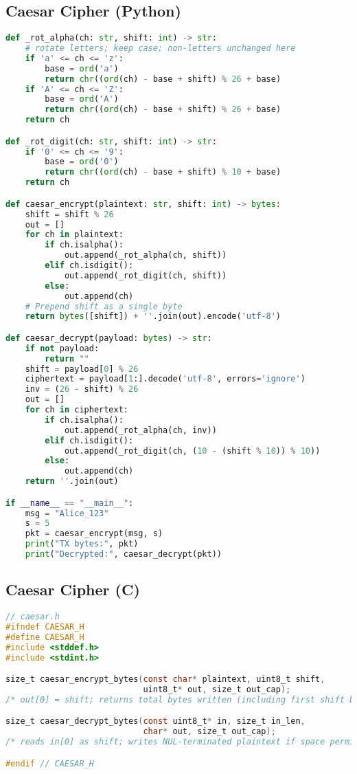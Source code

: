 \documentclass[11pt]{article}
\begin{document}
\subsection*{Caesar Cipher (Python)}
\begin{lstlisting}[language=Python, caption={caesar.py (Python sketch)}]
def _rot_alpha(ch: str, shift: int) -> str:
    # rotate letters; keep case; non-letters unchanged here
    if 'a' <= ch <= 'z':
        base = ord('a')
        return chr((ord(ch) - base + shift) % 26 + base)
    if 'A' <= ch <= 'Z':
        base = ord('A')
        return chr((ord(ch) - base + shift) % 26 + base)
    return ch

def _rot_digit(ch: str, shift: int) -> str:
    if '0' <= ch <= '9':
        base = ord('0')
        return chr((ord(ch) - base + shift) % 10 + base)
    return ch

def caesar_encrypt(plaintext: str, shift: int) -> bytes:
    shift = shift % 26
    out = []
    for ch in plaintext:
        if ch.isalpha():
            out.append(_rot_alpha(ch, shift))
        elif ch.isdigit():
            out.append(_rot_digit(ch, shift))
        else:
            out.append(ch)
    # Prepend shift as a single byte
    return bytes([shift]) + ''.join(out).encode('utf-8')

def caesar_decrypt(payload: bytes) -> str:
    if not payload:
        return ""
    shift = payload[0] % 26
    ciphertext = payload[1:].decode('utf-8', errors='ignore')
    inv = (26 - shift) % 26
    out = []
    for ch in ciphertext:
        if ch.isalpha():
            out.append(_rot_alpha(ch, inv))
        elif ch.isdigit():
            out.append(_rot_digit(ch, (10 - (shift % 10)) % 10))
        else:
            out.append(ch)
    return ''.join(out)

if __name__ == "__main__":
    msg = "Alice_123"
    s = 5
    pkt = caesar_encrypt(msg, s)
    print("TX bytes:", pkt)
    print("Decrypted:", caesar_decrypt(pkt))
\end{lstlisting}

\subsection*{Caesar Cipher (C)}
\begin{lstlisting}[language=C, caption={caesar.c / caesar.h (C sketch)}]
// caesar.h
#ifndef CAESAR_H
#define CAESAR_H
#include <stddef.h>
#include <stdint.h>

size_t caesar_encrypt_bytes(const char* plaintext, uint8_t shift,
                            uint8_t* out, size_t out_cap);
/* out[0] = shift; returns total bytes written (including first shift byte) */

size_t caesar_decrypt_bytes(const uint8_t* in, size_t in_len,
                            char* out, size_t out_cap);
/* reads in[0] as shift; writes NUL-terminated plaintext if space permits */

#endif // CAESAR_H
\end{lstlisting}
\end{document}
